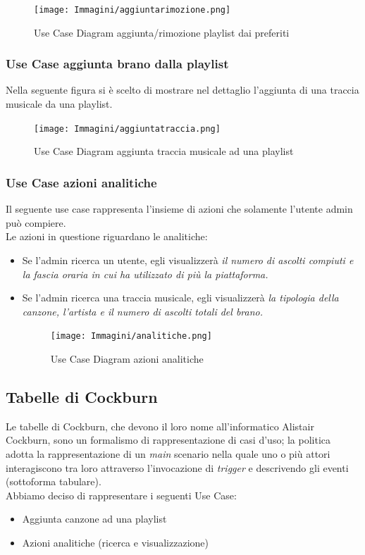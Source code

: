 \documentclass{article}
\begin{document}
			\begin{figure}[H]
				\centering
				\texttt{[image: Immagini/aggiuntarimozione.png]}
				\caption{Use Case Diagram aggiunta/rimozione playlist dai preferiti}
			\end{figure}
			\newpage
			\subsubsection{Use Case aggiunta brano dalla playlist}
			Nella seguente figura si è scelto di mostrare nel dettaglio l'aggiunta di una traccia musicale da una playlist.
			
			\begin{figure}[H]
				\centering
				\texttt{[image: Immagini/aggiuntatraccia.png]}
				\caption{Use Case Diagram aggiunta traccia musicale ad una playlist}
			\end{figure}
			
			\subsubsection{Use Case azioni analitiche}
			Il seguente use case rappresenta l'insieme di azioni che solamente l'utente admin può compiere.\\
			Le azioni in questione riguardano le analitiche:
			\begin{itemize}
				\item Se l'admin ricerca un utente, egli visualizzerà \textit{il numero di ascolti compiuti e la fascia oraria in cui ha utilizzato di più la piattaforma.}
				\item Se l'admin ricerca una traccia musicale, egli visualizzerà \textit{la tipologia della canzone, l'artista e il numero di ascolti totali del brano.}
				
				\begin{figure}[H]
					\centering
					\texttt{[image: Immagini/analitiche.png]}
					\caption{Use Case Diagram azioni analitiche}
				\end{figure}
			\end{itemize}
			\newpage
		\subsection{Tabelle di Cockburn}
		Le tabelle di Cockburn, che devono il loro nome all'informatico Alistair Cockburn, sono un formalismo di rappresentazione di casi d'uso; la politica adotta la rappresentazione di un \textit{main} scenario nella quale uno o più attori interagiscono tra loro attraverso l'invocazione di \textit{trigger} e descrivendo gli eventi (sottoforma tabulare).\\
		Abbiamo deciso di rappresentare i seguenti Use Case:
		\begin{itemize}
			\item Aggiunta canzone ad una playlist 
			\item Azioni analitiche (ricerca e visualizzazione)
		\end{itemize}
		\newpage
		
		\newpage
		
		\newpage
		
\end{document}
